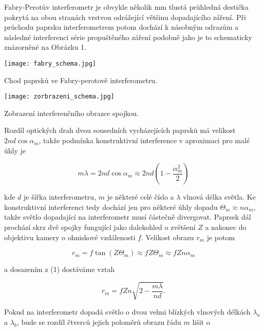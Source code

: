 \documentclass[a4paper,11pt]{article}
\begin{document}
Fabry-Perotův interferometr je obvykle několik mm tlustá průhledná destička pokrytá na obou stranách vrstvou odrážející většinu dopadajícího záření. Při průchodu paprsku interferometrem potom dochází k násobným odrazům a následné interferenci série propuštěného záření podobně jako je to schematicky znázorněné na Obrázku 1.

\begin{table}[htpb]
    \captionsetup{type=figure}
    \begin{minipage}{.45\linewidth}
        \centering
        \texttt{[image: fabry\_schema.jpg]}
        \caption{Chod paprsků ve Fabry-perotově interferometru. }
    \end{minipage} 
    \hfill
    \begin{minipage}{.45\linewidth}
        \centering
        \texttt{[image: zorbrazeni\_schema.jpg]}
        \caption{Zobrazení interferenčního obrazce spojkou. }
    \end{minipage} 
\end{table}

Rozdíl optických drah dvou sousedních vycházejících paprsků má velikost $ 2 n d \cos \alpha_m $, takže podmínka konstruktivní interference v aproximaci pro malé úhly je 

\begin{equation}
m \lambda = 2 n d \cos \alpha_m \approx 2 n d \left( 1 - \frac{\alpha^2_m}{2} \right)
\end{equation}

\noindent
kde $ d $ je šířka interferometru, $ m $ je některé celé číslo a $ \lambda $ vlnová délka světla. Ke konstruktivní interferenci tedy dochází jen pro některé úhly dopadu $ \Theta_m \approx n \alpha_m $, takže světlo dopadající na interferometr musí částečně divergovat.  Paprsek dál prochází skrz dvě spojky fungující jako dalekohled o zvětšení $ Z $ a nakonec do objektivu kamery o ohniskové vzdálenosti $ f $. Velikost obrazu $ r_m $ je potom

\begin{equation}
r_m = f \tan ( Z \Theta_m ) \approx f Z \Theta_m \approx f Z n \alpha_m
\end{equation}

\noindent
a dosazením z (1) dostáváme vztah

\begin{equation}
    r_m = f Z n \sqrt{ 2 - \frac{m\lambda}{nd}  }.
\end{equation}

Pokud na interferometr dopadá světlo o dvou velmi blízkých vlnových délkách $ \lambda_a $ a $ \lambda_b $, bude se rozdíl čtverců jejich poloměrů obrazu řádu $ m $ lišit o 
\end{document}
